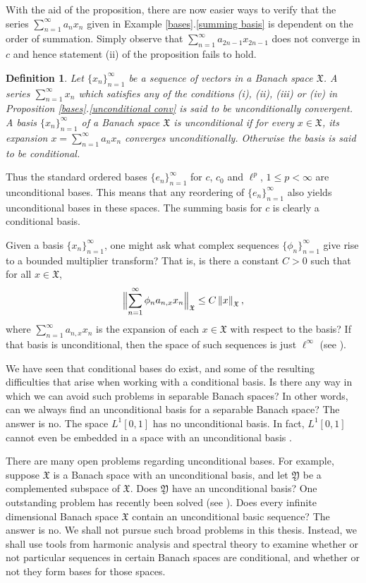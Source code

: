 \documentclass[mmath,12pt]{unswthesis}   %
\newcommand{\X}{\mathfrak{X}}
\newcommand{\Y}{\mathfrak{Y}}
\newcommand{\reff}[2]{\ref{#1}.\ref{#2}}
\def\lp{\ell^p}
\def\norm#1{\left \Vert #1 \right \Vert}
\def\snorm#1{\Bigl \Vert #1 \Bigr \Vert}
\newtheorem{definition}[theorem]{Definition}
\numberwithin{equation}{section}
\begin{document}
With the aid of the proposition, there are now easier ways to verify that the
series
$\sum_{n=1}^{\infty}a_nx_n$ given in Example \reff{bases}{summing basis} is
dependent on the order of summation. Simply observe that
$\sum_{n=1}^{\infty}a_{2n-1}x_{2n-1}$ does not converge in $c$ and hence 
statement (ii) of the proposition fails to hold.

\begin{definition}
Let $\{x_n\}_{n=1}^{\infty}$ be a sequence of vectors in a Banach space $\X$.
A series $\sum_{n=1}^{\infty}x_n$ which satisfies any of the conditions (i),
(ii), (iii) or (iv) in Proposition \reff{bases}{unconditional conv} is said to 
be
{\em unconditionally convergent}. A basis $\{x_n\}_{n=1}^{\infty}$ of a Banach
space $\X$ is {\em unconditional} if for every $x\in\X$, its expansion
$x=\sum_{n=1}^{\infty}a_nx_n$ converges unconditionally. Otherwise the basis is
said to be {\em conditional}.
\end{definition}

Thus the standard ordered bases $\{e_n\}_{n=1}^{\infty}$ for $c$, $c_0$ and
$\lp$,
$1\leq p<\infty$ are unconditional bases. This means that any reordering of
$\{e_n\}_{n=1}^{\infty}$ also yields unconditional bases in these spaces.
The summing basis for $c$ is clearly a conditional basis.

Given a basis $\{x_n\}_{n=1}^{\infty}$, one might ask what
complex sequences $\{\phi_n\}_{n=1}^{\infty}$ give rise to a bounded multiplier
transform? That is, is there a constant $C>0$ such that for all $x\in\X$,
\[\snorm{\sum_{n=1}^{\infty}\phi_na_{n,x}x_n}_{\X}\leq C\norm{x}_{\X},\]
where $\sum_{n=1}^{\infty}a_{n,x}x_n$ is the expansion of each $x\in\X$ with
respect to the basis? If that basis is unconditional, then the space of such
sequences is just $\ell^{\infty}$ (see \cite[Proposition 1.c.7]{Lind}).


We have seen that conditional bases do exist, and some of the resulting
difficulties that arise when working with a conditional basis. Is there any way
in which we can avoid such problems in separable Banach spaces? In other words,
can we always find an unconditional
basis for a separable Banach space? The answer is no. The space $L^1[0,1]$ has
no unconditional basis. In fact, $L^1[0,1]$ cannot even be embedded in a space
with an unconditional basis \cite[Propostion 1.d.1]{Lind}.

There are many open problems regarding unconditional bases. For example,
suppose $\X$ is a Banach space with an unconditional basis, and let $\Y$ be
a complemented subspace of $\X$. Does $\Y$ have an unconditional basis? One
outstanding problem has recently been solved (see \cite{Gowers}).
Does every infinite dimensional Banach space $\X$ contain an unconditional
basic sequence? The answer is no.
We shall not pursue such broad problems in this thesis. Instead, we shall use 
tools from harmonic analysis and spectral theory to examine whether or not
particular sequences in certain Banach spaces are conditional, and whether or 
not
they form bases for those spaces.
\end{document}
